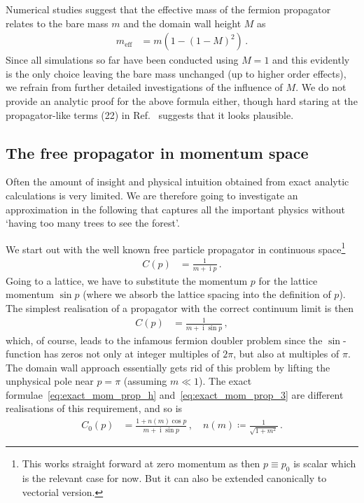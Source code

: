 \documentclass[a4paper]{article}
\DeclareMathOperator{\im}{i}
\begin{document}
	Numerical studies suggest that the effective mass of the fermion propagator relates to the bare mass $m$ and the domain wall height $M$ as
	\begin{align}
		m_\text{eff} &= m\left(1-(1-M)^2\right)\,.
	\end{align}
	Since all simulations so far have been conducted using $M=1$ and this evidently is the only choice leaving the bare mass unchanged (up to higher order effects), we refrain from further detailed investigations of the influence of $M$. We do not provide an analytic proof for the above formula either, though hard staring at the propagator-like terms (22) in Ref.~\cite{hands_thirring2016} suggests that it looks plausible.
	
	\subsection{The free propagator in momentum space}
	Often the amount of insight and physical intuition obtained from exact analytic calculations is very limited. We are therefore going to investigate an approximation in the following that captures all the important physics without `having too many trees to see the forest'.
	
	We start out with the well known free particle propagator in continuous space\footnote{This works straight forward at zero momentum as then $p\equiv p_0$ is scalar which is the relevant case for now. But it can also be extended canonically to vectorial version.}
	\begin{align}
		C(p) &= \frac{1}{m+\im p}\,.
	\end{align}
	Going to a lattice, we have to substitute the momentum $p$ for the lattice momentum $\sin p$ (where we absorb the lattice spacing into the definition of $p$). The simplest realisation of a propagator with the correct continuum limit is then
	\begin{align}
		C(p) &= \frac{1}{m+\im \sin p}\,,
	\end{align}
	which, of course, leads to the infamous fermion doubler problem since the $\sin$-function has zeros not only at integer multiples of $2\pi$, but also at multiples of $\pi$. The domain wall approach essentially gets rid of this problem by lifting the unphysical pole near $p=\pi$ (assuming $m\ll 1$). The exact formulae~\eqref{eq:exact_mom_prop_h} and~\eqref{eq:exact_mom_prop_3} are different realisations of this requirement, and so is
	\begin{align}
		C_0(p) &= \frac{1+n(m)\cos p}{m+\im \sin p}\,,\quad n(m) \coloneqq \frac{1}{\sqrt{1+m^2}}\,.
	\end{align}
\end{document}

